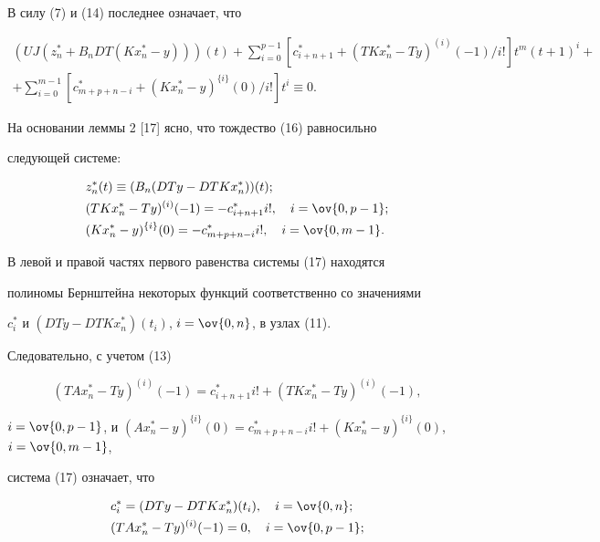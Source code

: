 \begin{pf}
В силу (7) и (14) последнее означает, что 


\begin{multline} 


(U J(z^*_n+B_n D T(K x^*_n-y)))(t)+\sum^{p-1}_{i=0} 


[c^*_{i+n+1}+(T K x^*_n-T y)^{(i)}(-1)/i!]t^m(t+1)^i+ \\ 


+\sum^{m-1}_{i=0}[c^*_{m+p+n-i}+(K x^*_n-y)^{\{i\}}(0)/i!] 


t^i\equiv0. 


\end{multline} 


На основании леммы 2 [17] ясно, что тождество (16) равносильно 


следующей системе: 


\begin{align} 


& z^*_n(t)\equiv(B_n(D T y-D T K x^*_n))(t);\notag\\ 


&(T K x^*_n-T y)^{(i)}(-1)=-c^*_{i+n+1}i!,\quad i=\ov{0,p-1};\\ 


&(K x^*_n-y)^{\{i\}}(0)=-c^*_{m+p+n-i}i!,\quad i=\ov{0,m-1}.\notag 


\end{align} 


В левой и правой частях первого равенства системы (17) находятся 


полиномы Бернштейна некоторых функций соответственно со значениями 


$c^*_i$ и $(D T y-D T K x^*_n)(t_i)$, $i=\ov{0,n}$, в узлах (11). 


Следовательно, с учетом (13) 


$$ 


(T A x^*_n-T y)^{(i)}(-1)=c^*_{i+n+1}i!+(T K x^*_n-T y)^{(i)}(-1), 


$$ 


$i=\ov{0,p-1}$, и $(Ax^*_n-y)^{\{i\}}(0)=c^*_{m+p+n-i}i!+(K 


x^*_n-y)^{\{i\}}(0)$, $i=\ov{0,m-1}$, 


система (17) означает, что 


\begin{align} 


& c^*_i=(D T y-D T K x^*_n)(t_i),\quad i=\ov{0,n};\notag\\ 


& (T A x^*_n-T y)^{(i)}(-1)=0,\quad i=\ov{0,p-1}; \\ 



\end{align}
\end{pf}
